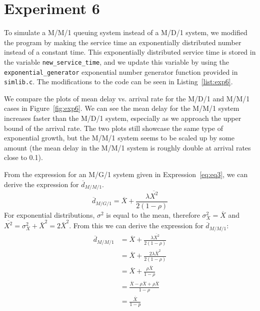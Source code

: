 \section*{Experiment 6}
To simulate a M/M/1 queuing system instead of a M/D/1 system, we modified the program by making the service time an exponentially distributed number instead of a constant time. This exponentially distributed service time is stored in the variable \texttt{new\_service\_time}, and we update this variable by using the \texttt{exponential\_generator} exponential number generator function provided in \texttt{simlib.c}. The modifications to the code can be seen in Listing~\ref{list:exp6}.

We compare the plots of mean delay vs. arrival rate for the M/D/1 and M/M/1 cases in Figure~\ref{fig:exp6}. We can see the mean delay for the M/M/1 system increases faster than the M/D/1 system, especially as we approach the upper bound of the arrival rate. The two plots still showcase the same type of exponential growth, but the M/M/1 system seems to be scaled up by some amount (the mean delay in the M/M/1 system is roughly double at arrival rates close to 0.1).

From the expression for an M/G/1 system given in Expression~\ref{eq:eq3}, we can derive the expression for $\overline{d}_{M/M/1}$.
\begin{equation}
	\overline{d}_{M/G/1}=\overline{X} + \frac{\lambda\overline{X^2}}{2(1-\rho)}
	\label{eq:eq3}
\end{equation}
For exponential distributions, $\sigma^2$ is equal to the mean, therefore $\sigma^2_X = \overline{X}$ and $\overline{X^2} = \sigma^2_X + \bar{X}^2 = 2\bar{X}^2$. From this we can derive the expression for $\overline{d}_{M/M/1}$:
\begin{align}
	\overline{d}_{M/M/1} &= \overline{X} + \frac{\lambda\overline{X^2}}{2(1-\rho)} \nonumber\\
	&= \overline{X} + \frac{2\lambda\bar{X}^2}{2(1-\rho)} \nonumber\\
	&= \overline{X} + \frac{\rho\overline{X}}{1-\rho} \nonumber\\
	&= \frac{\overline{X} - \rho\overline{X} + \rho\overline{X}}{1-\rho} \nonumber\\
	&= \frac{\overline{X}}{1-p}
\end{align}

